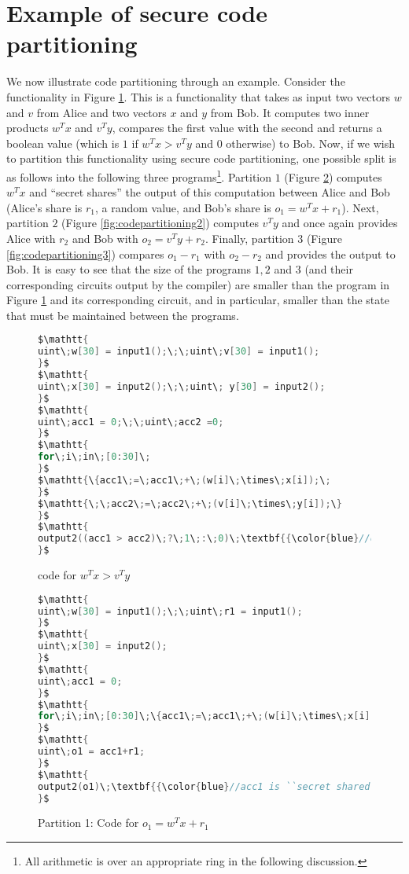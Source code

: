 \newpage

\section{Example of secure code partitioning}\label{app:codepartitioning}
We now illustrate code partitioning through an example. Consider the functionality in Figure \ref{fig:largecode}. This is a functionality that takes as input two vectors $w$ and $v$ from Alice and two vectors $x$ and $y$ from Bob. It computes two inner products $w^Tx$ and $v^Ty$, compares the first value with the second and returns a boolean value (which is $1$ if $w^Tx>v^Ty$ and $0$ otherwise) to Bob. Now, if we wish to partition this functionality using secure code partitioning, one possible split is as follows into the following three programs\footnote{All arithmetic is over an appropriate ring in the following discussion.}. Partition $1$ (Figure \ref{fig:codepartitioning1}) computes $w^Tx$ and ``secret shares'' the output of this computation between Alice and Bob (Alice's share is $r_1$, a random value, and Bob's share is $o_1 = w^Tx+r_1$). Next, partition $2$ (Figure \ref{fig:codepartitioning2}) computes $v^Ty$ and once again provides Alice with $r_2$ and Bob with $o_2 = v^Ty+r_2$. Finally, partition $3$ (Figure \ref{fig:codepartitioning3}) compares $o_1-r_1$ with $o_2-r_2$ and provides the output to Bob. It is easy to see that the size of the programs $1, 2$ and $3$ (and their corresponding circuits output by the \tool compiler) are smaller than the program in Figure \ref{fig:largecode} and its corresponding circuit, and in particular, smaller than the state that must be maintained between the programs.

\begin{figure}
\begin{lstlisting}[language=C,mathescape=true]
$\mathtt{
uint\;w[30] = input1();\;\;uint\;v[30] = input1();
}$
$\mathtt{
uint\;x[30] = input2();\;\;uint\; y[30] = input2();
}$
$\mathtt{
uint\;acc1 = 0;\;\;uint\;acc2 =0;
}$
$\mathtt{
for\;i\;in\;[0:30]\;
}$
$\mathtt{\{acc1\;=\;acc1\;+\;(w[i]\;\times\;x[i]);\;
}$
$\mathtt{\;\;acc2\;=\;acc2\;+\;(v[i]\;\times\;y[i]);\}
}$
$\mathtt{
output2((acc1 > acc2)\;?\;1\;:\;0)\;\textbf{{\color{blue}//only to party 2}}
}$
\end{lstlisting}
\caption{\tool code for $w^Tx > v^Ty$}
\label{fig:largecode}
\end{figure}

\begin{figure}
\begin{lstlisting}[language=C,mathescape=true]
$\mathtt{
uint\;w[30] = input1();\;\;uint\;r1 = input1();
}$
$\mathtt{
uint\;x[30] = input2();
}$
$\mathtt{
uint\;acc1 = 0;
}$
$\mathtt{
for\;i\;in\;[0:30]\;\{acc1\;=\;acc1\;+\;(w[i]\;\times\;x[i]);\}
}$
$\mathtt{
uint\;o1 = acc1+r1;
}$
$\mathtt{
output2(o1)\;\textbf{{\color{blue}//acc1 is ``secret shared''}}
}$
\end{lstlisting}
\caption{Partition 1: Code for $o_1 = w^Tx+r_1$}
\label{fig:codepartitioning1}
\end{figure}

